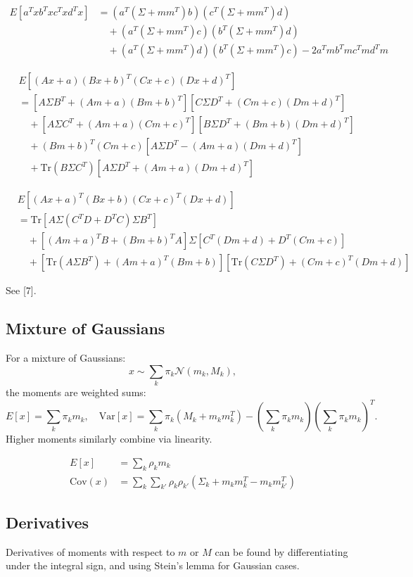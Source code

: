 \begin{align*}
E[a^Txb^Txc^Txd^Tx] &= (a^T(\Sigma + mm^T)b)(c^T(\Sigma + mm^T)d) \\
&\quad +(a^T(\Sigma + mm^T)c)(b^T(\Sigma + mm^T)d) \\
&\quad +(a^T(\Sigma + mm^T)d)(b^T(\Sigma + mm^T)c) - 2a^Tmb^Tmc^Tmd^Tm
\end{align*}

\begin{align*}
&E[(Ax + a)(Bx + b)^T(Cx + c)(Dx + d)^T] \\
&= [A\Sigma B^T + (Am + a)(Bm + b)^T][C\Sigma D^T + (Cm + c)(Dm + d)^T] \\
&\quad +[A\Sigma C^T + (Am + a)(Cm + c)^T][B\Sigma D^T + (Bm + b)(Dm + d)^T] \\
&\quad +(Bm + b)^T(Cm + c)[A\Sigma D^T - (Am + a)(Dm + d)^T] \\
&\quad +\text{Tr}(B\Sigma C^T)[A\Sigma D^T + (Am + a)(Dm + d)^T]
\end{align*}

\begin{align*}
&E[(Ax + a)^T(Bx + b)(Cx + c)^T(Dx + d)] \\
&= \text{Tr}[A\Sigma(C^TD + D^TC)\Sigma B^T] \\
&\quad +[(Am + a)^TB + (Bm + b)^TA]\Sigma[C^T(Dm + d) + D^T(Cm + c)] \\
&\quad +[\text{Tr}(A\Sigma B^T) + (Am + a)^T(Bm + b)][\text{Tr}(C\Sigma D^T) + (Cm + c)^T(Dm + d)]
\end{align*}

See [7].


\subsection{Mixture of Gaussians}
For a mixture of Gaussians:
\[
   x \sim \sum_k \pi_k \mathcal{N}(m_k, M_k),
\]
the moments are weighted sums:
\[
   E[x] = \sum_k \pi_k m_k, \quad
   \mathrm{Var}[x] = \sum_k \pi_k (M_k + m_k m_k^T) - \left(\sum_k \pi_k m_k\right)\left(\sum_k \pi_k m_k\right)^T.
\]
Higher moments similarly combine via linearity.


\begin{align*}
E[x] &= \sum_k \rho_k m_k \tag{384} \\[1em]
\text{Cov}(x) &= \sum_k\sum_{k'} \rho_k\rho_{k'} (\Sigma_k + m_km_k^T - m_km_{k'}^T) \tag{385}
\end{align*}

\subsection{Derivatives}
Derivatives of moments with respect to $m$ or $M$ can be found by differentiating under the integral sign, and using Stein's lemma for Gaussian cases.

